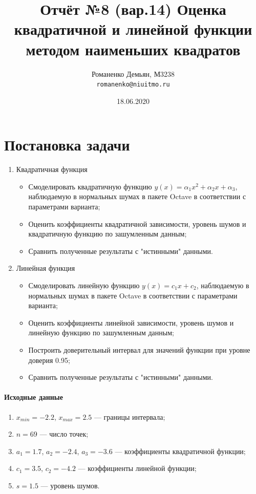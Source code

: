 \documentclass{article}
\title{\textbf{Отчёт №8 (вар.14)} Оценка квадратичной и линейной функции методом наименьших
квадратов}
\author{Романенко Демьян, М3238\\
    \texttt{romanenko@niuitmo.ru}}
\date{18.06.2020}
\begin{document}
	\maketitle
	\newpage
    
    \maketitle
    
    \section{Постановка задачи}
        \begin{enumerate}
            \item Квадратичная функция \begin{itemize}
                \item Смоделировать квадратичную функцию $y(x) = \alpha_1 x^2 + \alpha_2 x + \alpha_3$, наблюдаемую в нормальных шумах в пакете Octave в соответствии с параметрами варианта;
                \item Оценить коэффициенты квадратичной зависимости, уровень шумов и квадратичную функцию по зашумленным данным;
                \item Сравнить полученные результаты с "истинными" данными.
            \end{itemize}
            \item Линейная функция \begin{itemize}
                \item Смоделировать линейную функцию $y(x) = c_1 x + c_2$, наблюдаемую в нормальных шумах в пакете Octave в соответствии с параметрами варианта;
                \item Оценить коэффициенты линейной зависимости, уровень шумов и линейную функцию по зашумленным данным;
                \item Построить доверительный интервал для значений функции при уровне доверия 0.95;
                \item Сравнить полученные результаты с "истинными" данными.
            \end{itemize}
        \end{enumerate}
    \paragraph{Исходные данные}
        \begin{enumerate}
            \item $x_{min} = -2.2$, $x_{max} = 2.5$ {---} границы интервала;
            \item $n = 69$ {---} число точек;
            \item $a_1 = 1.7$, $a_2 = -2.4$, $a_3 = -3.6$ {---} коэффициенты квадратичной функции;
            \item $c_1 = 3.5$, $c_2 = -4.2$ {---} коэффициенты линейной функции;
            \item $s = 1.5$ {---} уровень шумов.
        \end{enumerate}    
\end{document}

